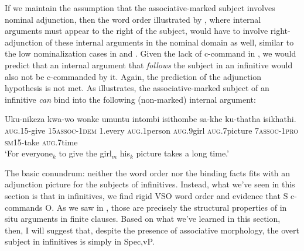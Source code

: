 \documentclass[output=paper,colorlinks,citecolor=brown]{langscibook}
\begin{document}
\ea%
    \label{ex:halpert:16}
    \z 
\z 

If we maintain the assumption that the associative-marked subject involves nominal adjunction, then the word order illustrated by , where internal arguments must appear to the right of the subject, would have to involve right-adjunction of these internal arguments in the nominal domain as well, similar to the low nominalization cases in  and .  Given the lack of c-command in , we would predict that an internal argument that \textit{follows} the subject in an infinitive would also not be c-commanded by it. Again, the prediction of the adjunction hypothesis is not met.  As  illustrates, the associative-marked subject of an infinitive \textit{can} bind into the following (non-marked) internal argument:

\ea%
    \label{ex:halpert:17}
    \gll    Uku-nikeza kwa-wo wonke umuntu intombi isithombe sa-khe ku-thatha isikhathi.\\
            \textsc{aug}.15-give 15\textsc{assoc}-1\textsc{dem} 1.every \textsc{aug}.1person \textsc{aug}.9girl \textsc{aug}.7picture 7\textsc{assoc}-1\textsc{pro} \textsc{sm}15-take \textsc{aug}.7time\\
    \glt    `For everyone$_k$ to give the girl$_m$ his$_k$ picture takes a long time.'
\z 

The basic conundrum: neither the word order nor the binding facts fits with an adjunction picture for the subjects of infinitives.  Instead, what we've seen in this section is that in infinitives, we find rigid VSO word order and evidence that S c-commands O.  As we saw in , those are precisely the structural properties of in situ arguments in finite clauses.  Based on what we've learned in this section, then, I will suggest that, despite the presence of associative morphology, the overt subject in infinitives is simply in Spec,vP.
\end{document}
